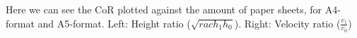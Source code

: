 \documentclass[preview]{standalone}
\begin{document}
\begin{center}
Here we can see the CoR plotted against the amount of paper sheets, for A4-format and A5-format. Left: Height ratio ($\sqrt{rac{h_1}{h_0}}$). Right: Velocity ratio ($\frac{v_1}{v_0}$)
\end{center}
\end{document}

